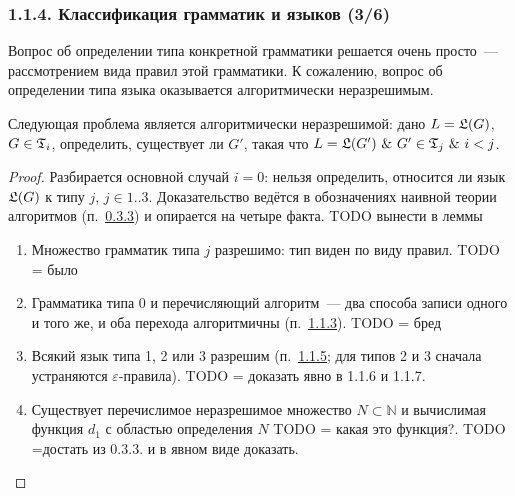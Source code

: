 \documentclass[mathserif,12pt,aspectratio=169]{beamer}
\def\And{\operatorname{\,\&\,}}
\def\DMref#1#2{{\color{blue}\underline{\hyperlink{#2}{#1}}}}
\def\TODO#1{{\color{gray} TODO {#1}}}
\begin{document}
\begin{frame}
\frametitle{1.1.4. Классификация грамматик и языков (3/6)}

Вопрос об определении типа конкретной грамматики решается очень просто~---
рассмотрением вида правил этой грамматики. К сожалению, вопрос об определении
типа языка оказывается алгоритмически неразрешимым.

\begin{theorem}
Следующая проблема является алгоритмически неразрешимой: дано $L=\frak{L}(G)$,
$G\in\frak{T}_i$, определить, существует ли $G'$, такая что
$L=\frak{L}(G')\And G'\in\frak{T}_j\And i<j$.
\end{theorem}

\begin{proof}
Разбирается основной случай $i=0$: нельзя определить, относится ли язык
$\frak{L}(G)$ к типу $j$, $j\in 1..3$. Доказательство ведётся в обозначениях
наивной теории алгоритмов (п.~\DMref{0.3.3}{0.3.3}) и опирается на четыре факта.
\TODO{ вынести в леммы}


\begin{enumerate}
\item Множество грамматик типа $j$ разрешимо: тип виден по виду правил.\TODO{= было}
\item Грамматика типа 0 и перечисляющий алгоритм~--- два способа записи одного и
того же, и оба перехода алгоритмичны (п.~\DMref{1.1.3}{1.1.3.}). \TODO{= бред}
\item Всякий язык типа 1, 2 или 3 разрешим (п.~\DMref{1.1.5}{1.1.5.}; для типов
2 и 3 сначала устраняются $\varepsilon$-правила). \TODO{= доказать явно в 1.1.6 и 1.1.7.}
\item Существует перечислимое неразрешимое множество $N\subset\mathbb{N}$ и вычислимая
функция $d_1$ с областью определения $N$ \TODO{= какая это функция?}.
\TODO{=достать из 0.3.3. и в явном виде доказать.}

\end{enumerate}
\end{proof}
\end{frame}
\end{document}

